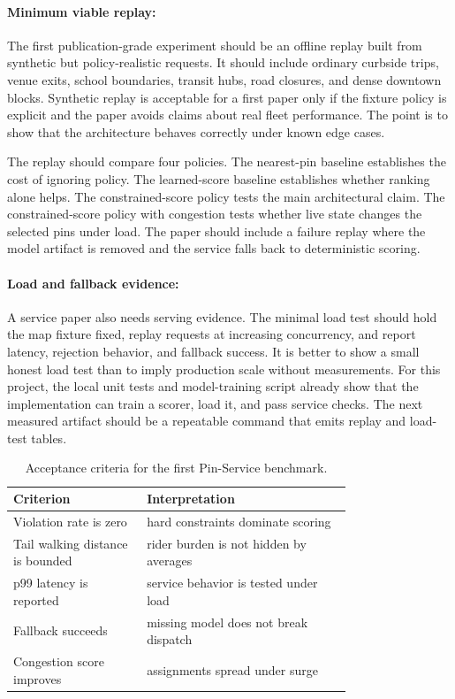 \documentclass{article}
\begin{document}
\paragraph{Minimum viable replay:}

The first publication-grade experiment should be an offline replay built from synthetic but policy-realistic requests. It should include ordinary curbside trips, venue exits, school boundaries, transit hubs, road closures, and dense downtown blocks. Synthetic replay is acceptable for a first paper only if the fixture policy is explicit and the paper avoids claims about real fleet performance. The point is to show that the architecture behaves correctly under known edge cases.

The replay should compare four policies. The nearest-pin baseline establishes the cost of ignoring policy. The learned-score baseline establishes whether ranking alone helps. The constrained-score policy tests the main architectural claim. The constrained-score policy with congestion tests whether live state changes the selected pins under load. The paper should include a failure replay where the model artifact is removed and the service falls back to deterministic scoring.

\paragraph{Load and fallback evidence:}

A service paper also needs serving evidence. The minimal load test should hold the map fixture fixed, replay requests at increasing concurrency, and report latency, rejection behavior, and fallback success. It is better to show a small honest load test than to imply production scale without measurements. For this project, the local unit tests and model-training script already show that the implementation can train a scorer, load it, and pass service checks. The next measured artifact should be a repeatable command that emits replay and load-test tables.

\begin{table}[t]
\centering
\caption{Acceptance criteria for the first Pin-Service benchmark.}
\begin{tabular}{@{}p{0.30\linewidth}p{0.46\linewidth}@{}}
\toprule
\textbf{Criterion} & \textbf{Interpretation}\\
\midrule
Violation rate is zero & hard constraints dominate scoring\\
Tail walking distance is bounded & rider burden is not hidden by averages\\
p99 latency is reported & service behavior is tested under load\\
Fallback succeeds & missing model does not break dispatch\\
Congestion score improves & assignments spread under surge\\
\bottomrule
\end{tabular}
\end{table}
\end{document}
